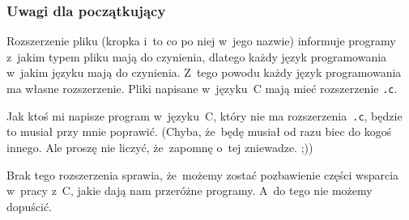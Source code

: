 \documentclass[10pt,t]{beamer}
\begin{document}
\begin{frame}
  \frametitle{Uwagi dla początkujący}


  Rozszerzenie pliku (kropka i~to co po niej w~jego nazwie) informuje
  programy z~jakim typem pliku mają do czynienia, dlatego każdy język
  programowania w~jakim języku mają do czynienia. Z~tego powodu każdy
  język programowania ma \alert{własne} rozszerzenie. Pliki napisane
  w~języku~C mają mieć rozszerzenie \texttt{.c}.

  Jak ktoś mi napisze program w~języku~C, który \alert{nie} ma
  rozszerzenia~\texttt{.c}, będzie to musiał przy mnie poprawić.
  (Chyba, że~będę musiał od razu biec do kogoś innego. Ale proszę nie
  liczyć, że~zapomnę o~tej zniewadze. ;))

  Brak tego rozszerzenia sprawia, że~możemy zostać pozbawienie części
  wsparcia w~pracy z~C, jakie dają nam przeróżne programy. A~do tego
  \alert{nie} możemy dopuścić.

\end{frame}
























\printbibliography





\end{document}
